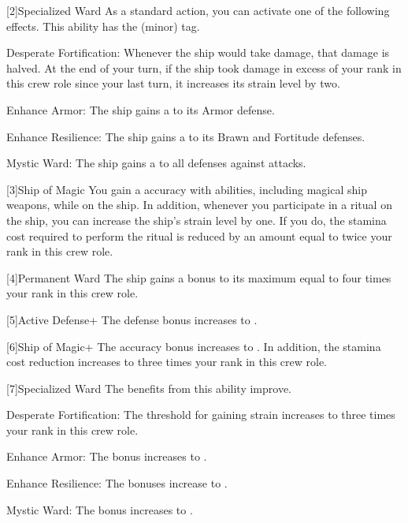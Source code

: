     [2]{Specialized Ward} As a standard action, you can activate one of the following effects.
      This ability has the  (minor) tag.
      \begin{raggeditemize}
        \item Desperate Fortification: Whenever the ship would take damage, that damage is halved.
          At the end of your turn, if the ship took damage in excess of your rank in this crew role since your last turn, it increases its strain level by two.
        \item Enhance Armor: The ship gains a   to its Armor defense.
        \item Enhance Resilience: The ship gains a   to its Brawn and Fortitude defenses.
        \item Mystic Ward: The ship gains a   to all defenses against \magical attacks.
      \end{raggeditemize}

    [3]{Ship of Magic} You gain a  accuracy with \magical abilities, including magical ship weapons, while on the ship.
      In addition, whenever you participate in a ritual on the ship, you can increase the ship's strain level by one.
      If you do, the stamina cost required to perform the ritual is reduced by an amount equal to twice your rank in this crew role.

    [4]{Permanent Ward} The ship gains a bonus to its maximum  equal to four times your rank in this crew role.

    [5]{Active Defense+} The defense bonus increases to .

    [6]{Ship of Magic+} The accuracy bonus increases to .
      In addition, the stamina cost reduction increases to three times your rank in this crew role.

    [7]{Specialized Ward} The benefits from this ability improve.
      \begin{raggeditemize}
        \item Desperate Fortification: The threshold for gaining strain increases to three times your rank in this crew role.
        \item Enhance Armor: The bonus increases to .
        \item Enhance Resilience: The bonuses increase to .
        \item Mystic Ward: The bonus increases to .
      \end{raggeditemize}
